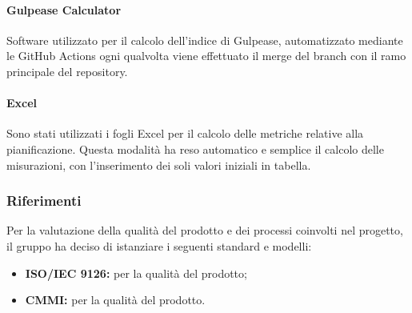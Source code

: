 \paragraph{Gulpease Calculator}
Software utilizzato per il calcolo dell'indice di Gulpease, automatizzato mediante le GitHub Actions ogni qualvolta viene effettuato il merge del branch con il ramo principale del repository.

\paragraph{Excel}
Sono stati utilizzati i fogli Excel per il calcolo delle metriche relative alla pianificazione. Questa modalità ha reso automatico e semplice il calcolo delle misurazioni, con l'inserimento dei soli valori iniziali in tabella.


\subsubsection{Riferimenti}
Per la valutazione della qualità del prodotto e dei processi coinvolti nel progetto, il gruppo ha deciso di istanziare i seguenti standard e modelli:
\begin{itemize}
	\item \textbf{ISO/IEC 9126:} per la qualità del prodotto;
	\item \textbf{CMMI:} per la qualità del prodotto.
\end{itemize}
